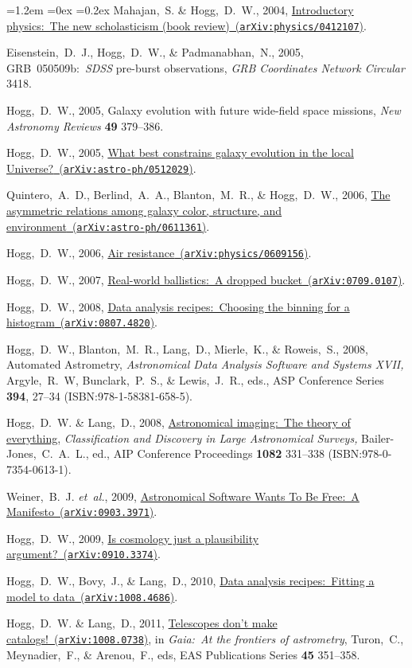 \documentclass[10pt,letterpaper]{article}
\newcommand{\acronym}[1]{{\small{#1}}}
\newcommand{\foreign}[1]{\textsl{#1}}
\newcommand{\etal}{\foreign{et~al.}}
\newcommand{\project}[1]{\textsl{#1}}
\newcommand{\doi}[2]{\href{http://dx.doi.org/#1}{{#2}}}
\newcommand{\isbn}[1]{{\footnotesize(\acronym{ISBN:}{#1})}}
\newcommand{\arxiv}[2]{\href{http://arxiv.org/abs/#1}{{#2}\ (\texttt{arXiv:#1})}}
\newcounter{refpubnum}
\newcommand{\hogglist}{%
    \rightmargin=0in
    \leftmargin=1.2em
    \topsep=0ex
    \partopsep=0pt
    \itemsep=0.2ex
    \parsep=0pt
    \itemindent=-1.0\leftmargin
    \listparindent=0.0\leftmargin
    \settowidth{\labelsep}{~}
    \usecounter{refpubnum}
  }
\begin{document}
\begin{list}{}{\hogglist}
Mahajan,~S. \& Hogg,~D.~W., 2004,
\arxiv{physics/0412107}{Introductory physics:\ The new scholasticism (book review)}.
\item
Eisenstein,~D.~J., Hogg,~D.~W., \& Padmanabhan,~N., 2005,
{\acronym{GRB}~050509b:\ \project{\acronym{SDSS}} pre-burst observations},
\textit{\acronym{GRB} Coordinates Network Circular} 3418.
\item
Hogg,~D.~W., 2005,
{Galaxy evolution with future wide-field space missions},
\textit{New Astronomy Reviews} \textbf{49} 379--386.
\item
Hogg,~D.~W., 2005,
\arxiv{astro-ph/0512029}{What best constrains galaxy evolution in the local Universe?}.
\item
Quintero,~A.~D., Berlind,~A.~A., Blanton,~M.~R., \& Hogg,~D.~W., 2006,
\arxiv{astro-ph/0611361}{The asymmetric relations among galaxy color, structure, and environment}.
\item
Hogg,~D.~W., 2006,
\arxiv{physics/0609156}{Air resistance}.
\item
Hogg,~D.~W., 2007,
\arxiv{0709.0107}{Real-world ballistics:\ A dropped bucket}.
\item
Hogg,~D.~W., 2008,
\arxiv{0807.4820}{Data analysis recipes:\ Choosing the binning for a histogram}.
\item
Hogg,~D.~W., Blanton,~M.~R., Lang,~D., Mierle,~K., \& Roweis,~S., 2008,
{Automated Astrometry},
\textit{Astronomical Data Analysis
Software and Systems XVII,} Argyle,~R.~W, Bunclark,~P.~S., \&
Lewis,~J.~R., eds., ASP Conference Series \textbf{394}, 27--34
\isbn{978-1-58381-658-5}.
\item
Hogg,~D.~W. \& Lang,~D., 2008,
\doi{10.1063/1.3059072}{Astronomical imaging:\ The theory of everything},
\textit{Classification and Discovery in Large Astronomical
Surveys,} Bailer-Jones,~C.~A.~L., ed., AIP Conference Proceedings
\textbf{1082} 331--338 \isbn{978-0-7354-0613-1}.
\item
Weiner,~B.~J. \etal, 2009,
\arxiv{0903.3971}{Astronomical Software Wants To Be Free:\ A Manifesto}.
\item
Hogg,~D.~W., 2009,
\arxiv{0910.3374}{Is cosmology just a plausibility argument?}.
\item
Hogg,~D.~W., Bovy,~J., \& Lang,~D., 2010,
\arxiv{1008.4686}{Data analysis recipes:\ Fitting a model to data}.
\item
Hogg,~D.~W. \& Lang,~D., 2011,
\arxiv{1008.0738}{Telescopes don't make catalogs!},
in \textit{Gaia:\ At the frontiers of astrometry}, Turon,~C., Meynadier,~F., \& Arenou,~F., eds,
EAS Publications Series \textbf{45} 351--358.

\end{list}
\end{document}
